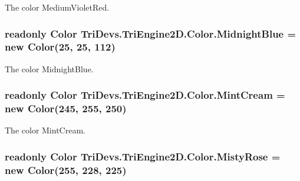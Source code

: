 The color Medium\-Violet\-Red. 

\hypertarget{struct_tri_devs_1_1_tri_engine2_d_1_1_color_a9d3ce36d04c98282b94bf2fec372d275}{
\subsubsection[{Midnight\-Blue}]{\setlength{\rightskip}{0pt plus 5cm}readonly {\bf Color} Tri\-Devs.\-Tri\-Engine2\-D.\-Color.\-Midnight\-Blue = new {\bf Color}(25, 25, 112)\hspace{0.3cm}{\ttfamily [static]}}}\label{struct_tri_devs_1_1_tri_engine2_d_1_1_color_a9d3ce36d04c98282b94bf2fec372d275}


The color Midnight\-Blue. 

\hypertarget{struct_tri_devs_1_1_tri_engine2_d_1_1_color_a061995739564ce7231a53de85ab530e5}{
\subsubsection[{Mint\-Cream}]{\setlength{\rightskip}{0pt plus 5cm}readonly {\bf Color} Tri\-Devs.\-Tri\-Engine2\-D.\-Color.\-Mint\-Cream = new {\bf Color}(245, 255, 250)\hspace{0.3cm}{\ttfamily [static]}}}\label{struct_tri_devs_1_1_tri_engine2_d_1_1_color_a061995739564ce7231a53de85ab530e5}


The color Mint\-Cream. 

\hypertarget{struct_tri_devs_1_1_tri_engine2_d_1_1_color_adfdfdf851699fe286e5e6b1ec33400e6}{
\subsubsection[{Misty\-Rose}]{\setlength{\rightskip}{0pt plus 5cm}readonly {\bf Color} Tri\-Devs.\-Tri\-Engine2\-D.\-Color.\-Misty\-Rose = new {\bf Color}(255, 228, 225)\hspace{0.3cm}{\ttfamily [static]}}}\label{struct_tri_devs_1_1_tri_engine2_d_1_1_color_adfdfdf851699fe286e5e6b1ec33400e6}


